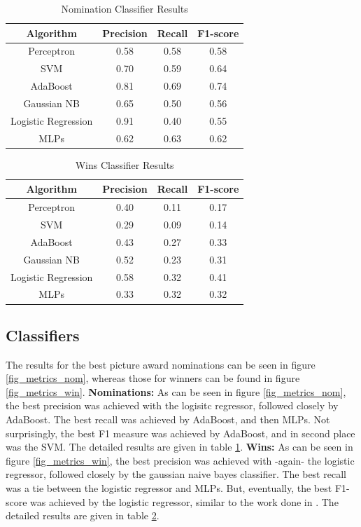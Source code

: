 \documentclass[journal,transmag]{IEEEtran}
\begin{document}
		\begin{table}
			\centering
			\begin{tabular}{|c|c|c|c|}
				\hline
				Algorithm & Precision & Recall & F1-score \\
				\hline
				Perceptron & 0.58 & 0.58 & 0.58 \\
				SVM & 0.70 & 0.59 & 0.64 \\
				AdaBoost & 0.81 & 0.69 & 0.74 \\
				Gaussian NB & 0.65 & 0.50 & 0.56 \\
				Logistic Regression & 0.91 & 0.40 & 0.55 \\
				MLPs & 0.62 & 0.63 & 0.62 \\
				\hline
			\end{tabular}
			\caption{Nomination Classifier Results}
			\label{tab:nom_metrics}
		\end{table}
		\begin{table}
			\centering
			\begin{tabular}{|c|c|c|c|}
				\hline
				Algorithm & Precision & Recall & F1-score \\
				\hline
				Perceptron & 0.40 & 0.11 & 0.17 \\
				SVM & 0.29 & 0.09 & 0.14 \\
				AdaBoost & 0.43 & 0.27 & 0.33 \\
				Gaussian NB & 0.52 & 0.23 & 0.31 \\
				Logistic Regression & 0.58 & 0.32 & 0.41 \\
				MLPs & 0.33 & 0.32 & 0.32 \\
				\hline
			\end{tabular}
			\caption{Wins Classifier Results}
			\label{tab:win_metrics}
		\end{table}		
		\subsection{Classifiers}
		The results for the best picture award nominations can be seen in figure \ref{fig_metrics_nom}, whereas those for winners can be found in figure \ref{fig_metrics_win}.
		\newline
		\textbf{Nominations:} As can be seen in figure \ref{fig_metrics_nom}, the best precision was achieved with the logisitc regressor, followed closely by AdaBoost. The best recall was achieved by AdaBoost, and then MLPs. Not surprisingly, the best F1 measure was achieved by AdaBoost, and in second place was the SVM. The detailed results are given in table \ref{tab:nom_metrics}.
		\newline
		\textbf{Wins:} As can be seen in figure \ref{fig_metrics_win}, the best precision was achieved with -again- the logistic regressor, followed closely by the gaussian naive bayes classifier. The best recall was a tie between the logistic regressor and MLPs. But, eventually, the best F1-score was achieved by the logistic regressor, similar to the work done in \cite{ref4}. The detailed results are given in table \ref{tab:win_metrics}.		
\end{document}
